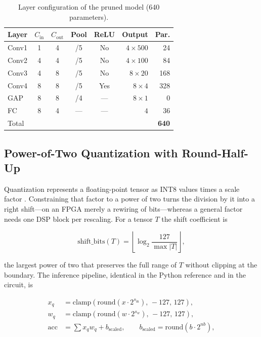 \documentclass[conference,10pt]{IEEEtran}
\begin{document}
\begin{table}[t]
\caption{Layer configuration of the pruned model (640 parameters).}
\label{tab:layers}
\centering
\footnotesize
\begin{tabular}{lccccrr}
\toprule
Layer & $C_{\text{in}}$ & $C_{\text{out}}$ & Pool & ReLU & Output & Par. \\
\midrule
Conv1 & 1 & 4 & /5 & No  & $4\times500$ & 24 \\
Conv2 & 4 & 4 & /5 & No  & $4\times100$ & 84 \\
Conv3 & 4 & 8 & /5 & No  & $8\times20$  & 168 \\
Conv4 & 8 & 8 & /5 & Yes & $8\times4$   & 328 \\
GAP   & 8 & 8 & /4 & --- & $8\times1$   & 0 \\
FC    & 8 & 4 & --- & --- & $4$         & 36 \\
\midrule
Total & & & & & & \textbf{640} \\
\bottomrule
\end{tabular}
\end{table}

\subsection{Power-of-Two Quantization with Round-Half-Up}

Quantization represents a floating-point tensor as INT8 values times a scale
factor \cite{jacob2018}. Constraining that factor to a power of two
\cite{miyashita2016} turns the division by it into a right shift---on an FPGA
merely a rewiring of bits---whereas a general factor needs one DSP block per
rescaling. For a tensor $T$ the shift coefficient is

\begin{equation}
\text{shift\_bits}(T) = \left\lfloor \log_2 \frac{127}{\max|T|} \right\rfloor ,
\end{equation}

the largest power of two that preserves the full range of $T$ without clipping at
the boundary. The inference pipeline, identical in the Python reference and in
the circuit, is

\begin{align}
x_q &= \mathrm{clamp}\!\left(\mathrm{round}(x \cdot 2^{s_{\text{in}}}),\,-127,\,127\right), \\
w_q &= \mathrm{clamp}\!\left(\mathrm{round}(w \cdot 2^{s_w}),\,-127,\,127\right), \\
\mathrm{acc} &= \textstyle\sum x_q w_q + b_{\text{scaled}},\qquad
b_{\text{scaled}} = \mathrm{round}(b\cdot 2^{nb}),
\end{align}
\end{document}
